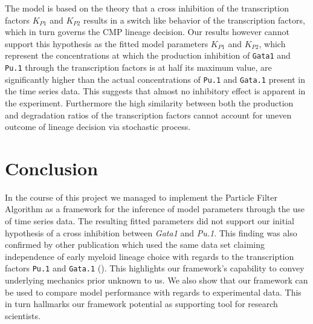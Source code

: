 \documentclass{bioinfo}
\begin{document}
The model is based on the theory that a cross inhibition of the transcription factors \texttt{$K_{P1}$} and \texttt{$K_{P2}$} results in a switch like behavior of the transcription factors, which in turn governs the CMP lineage decision. Our results however cannot support this hypothesis as the fitted model parameters \texttt{{$K_{P1}$}} and \texttt{{$K_{P2}$}}, which represent the concentrations at which the production inhibition of \texttt{Gata1} and \texttt{Pu.1} through the transcription factors is at half its maximum value, are significantly higher than the actual concentrations of \texttt{Pu.1} and \texttt{Gata.1} present in the time series data. This suggests that almost no inhibitory effect is apparent in the experiment. Furthermore the high similarity between both the production and degradation ratios of the transcription factors cannot account for uneven outcome of lineage decision via stochastic process.

\vspace*{-12pt}

\section{Conclusion}

In the course of this project we managed to implement the Particle Filter Algorithm as a framework for the inference of model parameters through the use of time series data. The resulting fitted parameters did not support our initial hypothesis of a cross inhibition between \textit{Gata1} and \textit{Pu.1}. This finding was also confirmed by other publication which used the same data set claiming independence of early myeloid lineage choice with regards to the transcription factors \texttt{Pu.1} and \texttt{Gata.1} (\citealp{Hoppe16}). This highlights our framework's capability to convey underlying mechanics prior unknown to us. We also show that our framework can be used to compare model performance with regards to experimental data. This in turn hallmarks our framework potential as supporting tool for research scientists.

\vspace*{-6pt}

\end{document}
